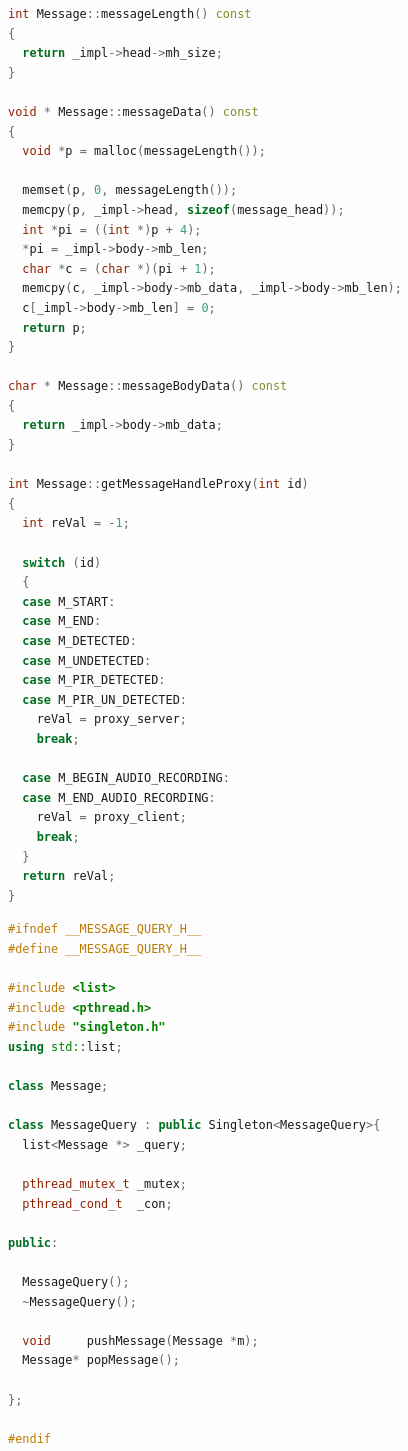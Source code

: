 \documentclass[11pt,a4paper,titlepage]{report}
\begin{document}
\begin{lstlisting}[caption=message.cpp,language=C++]
int Message::messageLength() const
{
  return _impl->head->mh_size;
}

void * Message::messageData() const
{
  void *p = malloc(messageLength());

  memset(p, 0, messageLength());
  memcpy(p, _impl->head, sizeof(message_head));
  int *pi = ((int *)p + 4);
  *pi = _impl->body->mb_len;
  char *c = (char *)(pi + 1);
  memcpy(c, _impl->body->mb_data, _impl->body->mb_len);
  c[_impl->body->mb_len] = 0;
  return p;
}

char * Message::messageBodyData() const
{
  return _impl->body->mb_data;
}

int Message::getMessageHandleProxy(int id)
{
  int reVal = -1;

  switch (id)
  {
  case M_START:
  case M_END:
  case M_DETECTED:
  case M_UNDETECTED:
  case M_PIR_DETECTED:
  case M_PIR_UN_DETECTED:
    reVal = proxy_server;
    break;

  case M_BEGIN_AUDIO_RECORDING:
  case M_END_AUDIO_RECORDING:
    reVal = proxy_client;
    break;
  }
  return reVal;
}
\end{lstlisting}





\begin{lstlisting}[caption=message-query.cpp,language=C++]
#ifndef __MESSAGE_QUERY_H__
#define __MESSAGE_QUERY_H__

#include <list>
#include <pthread.h>
#include "singleton.h"
using std::list;

class Message;

class MessageQuery : public Singleton<MessageQuery>{
  list<Message *> _query;

  pthread_mutex_t _mutex;
  pthread_cond_t  _con;

public:

  MessageQuery();
  ~MessageQuery();

  void     pushMessage(Message *m);
  Message* popMessage();

};

#endif

\end{lstlisting}
\end{document}
